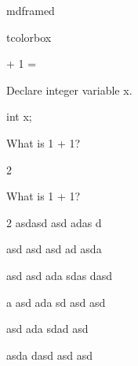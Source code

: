 

\renewcommand\AUTHOR{jdoe5@cougars.ccis.edu} %

\usepackage[linewidth=1pt]{mdframed}
\usepackage{lipsum}
\usepackage{tcolorbox}



\topmattertwo

mdframed
\begin{mdframed}
\lipsum[2]
\end{mdframed}


tcolorbox
\begin{tcolorbox}[arc=0pt,boxsep=0pt,left=2pt,right=2pt,top=2pt,bottom=2pt,boxrule=0.4pt,colframe=black,colback=white]
\lipsum[2]


\end{tcolorbox}

  
 + 1 = 

\nextq
Declare integer variable x.
\\
\ANSWER
\begin{answercode}
int x;
\end{answercode}

\nextq
What is 1 + 1?
\\
\ANSWER
\begin{answerlong}
2
\end{answerlong}

\nextq
What is 1 + 1?
\\
\ANSWER
\begin{answerlong}
2
asdasd
asd
adas
d

asd
asd
asd
ad
asda

asd
asd
ada
sdas
dasd


a
asd
ada
sd
asd
asd

asd
ada
sdad
asd

asda
dasd
asd
asd


\end{answerlong}

\newpage


